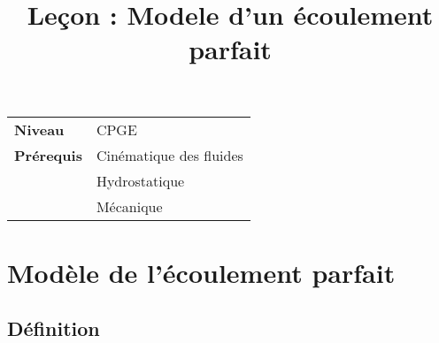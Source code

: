 \documentclass[10pt]{beamer}
\title{Leçon : Modele d'un écoulement parfait}
\begin{document}
\begin{frame}{}
    \titlepage

    \begin{tabularx}{\textwidth}{l@{:\,\,}X}
        \textbf{Niveau} 	  & CPGE\\
        \textbf{Prérequis} & Cinématique des fluides\\
        & Hydrostatique \\
        & 			Mécanique
    \end{tabularx}
\end{frame}

\begin{frame}
    \tableofcontents
\end{frame}

\section{Modèle de l'écoulement parfait}
\subsection{Définition}
\end{document}
